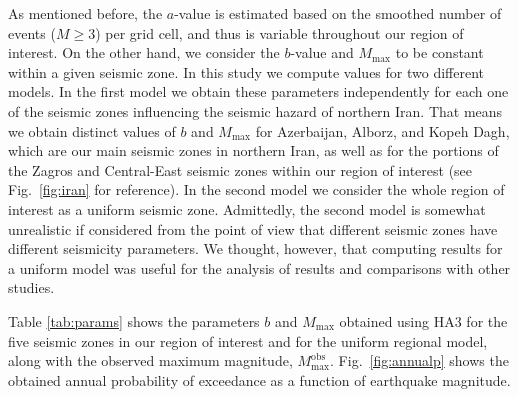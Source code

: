 As mentioned before, the $a$-value is estimated based on the smoothed number of events ($M \geq 3$) per grid cell, and thus is variable throughout our region of interest. On the other hand, we consider the $b$-value and $M_{\max}$ to be constant within a given seismic zone. In this study we compute values for two different models. In the first model we obtain these parameters independently for each one of the seismic zones influencing the seismic hazard of northern Iran. That means we obtain distinct values of $b$ and $M_{\max}$ for Azerbaijan, Alborz, and Kopeh Dagh, which are our main seismic zones in northern Iran, as well as for the portions of the Zagros and Central-East seismic zones within our region of interest (see Fig.~\ref{fig:iran} for reference). In the second model we consider the whole region of interest as a uniform seismic zone. Admittedly, the second model is somewhat unrealistic if considered from the point of view that different seismic zones have different seismicity parameters. We thought, however, that computing results for a uniform model was useful for the analysis of results and comparisons with other studies.

Table \ref{tab:params} shows the parameters $b$ and $M_{\max}$ obtained using HA3 for the five seismic zones in our region of interest and for the uniform regional model, along with the observed maximum magnitude, $M_{\max}^{\mathrm{obs}}$. Fig.~\ref{fig:annualp} shows the obtained annual probability of exceedance as a function of earthquake magnitude.




